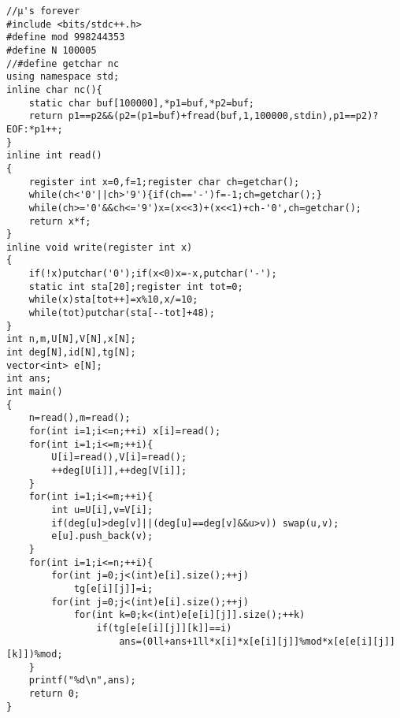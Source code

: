 \begin{verbatim}
//μ's forever
#include <bits/stdc++.h>
#define mod 998244353
#define N 100005
//#define getchar nc
using namespace std;
inline char nc(){
    static char buf[100000],*p1=buf,*p2=buf;
    return p1==p2&&(p2=(p1=buf)+fread(buf,1,100000,stdin),p1==p2)?EOF:*p1++;
}
inline int read()
{
    register int x=0,f=1;register char ch=getchar();
    while(ch<'0'||ch>'9'){if(ch=='-')f=-1;ch=getchar();}
    while(ch>='0'&&ch<='9')x=(x<<3)+(x<<1)+ch-'0',ch=getchar();
    return x*f;
}
inline void write(register int x)
{
    if(!x)putchar('0');if(x<0)x=-x,putchar('-');
    static int sta[20];register int tot=0;
    while(x)sta[tot++]=x%10,x/=10;
    while(tot)putchar(sta[--tot]+48);
}
int n,m,U[N],V[N],x[N];
int deg[N],id[N],tg[N];
vector<int> e[N];
int ans;
int main()
{
    n=read(),m=read();
    for(int i=1;i<=n;++i) x[i]=read();
    for(int i=1;i<=m;++i){
        U[i]=read(),V[i]=read();
        ++deg[U[i]],++deg[V[i]];
    }
    for(int i=1;i<=m;++i){
        int u=U[i],v=V[i];
        if(deg[u]>deg[v]||(deg[u]==deg[v]&&u>v)) swap(u,v);
        e[u].push_back(v);
    }
    for(int i=1;i<=n;++i){
        for(int j=0;j<(int)e[i].size();++j)
            tg[e[i][j]]=i;
        for(int j=0;j<(int)e[i].size();++j)
            for(int k=0;k<(int)e[e[i][j]].size();++k)
                if(tg[e[e[i][j]][k]]==i)
                    ans=(0ll+ans+1ll*x[i]*x[e[i][j]]%mod*x[e[e[i][j]][k]])%mod;
    }
    printf("%d\n",ans);
    return 0;
}
\end{verbatim}
